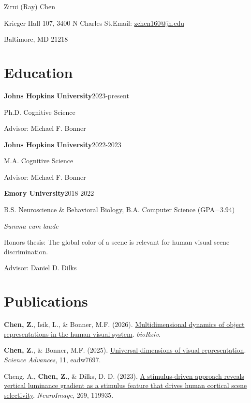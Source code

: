 \documentclass[10pt,letterpaper]{article}
\newcommand{\entry}[2]{\textbf{#1}\hfill #2\par}
\newcommand{\cit}[1]{\begingroup\hangindent=0.32in\hangafter=1 #1\par\endgroup\vspace{3pt}}
\begin{document}
\thispagestyle{empty}

{\fontsize{22}{26}\selectfont Zirui (Ray) Chen\par}
\vspace{6pt}
Krieger Hall 107, 3400 N Charles St.\hfill Email: \href{mailto:zchen160@jh.edu}{zchen160@jh.edu}\par
Baltimore, MD 21218\par

\section{Education}
\entry{Johns Hopkins University}{2023-present}
Ph.D. Cognitive Science\par
Advisor: Michael F. Bonner\par
\vspace{8pt}

\entry{Johns Hopkins University}{2022-2023}
M.A. Cognitive Science\par
Advisor: Michael F. Bonner\par
\vspace{8pt}

\entry{Emory University}{2018-2022}
B.S. Neuroscience \& Behavioral Biology, B.A. Computer Science (GPA=3.94)\par
\textit{Summa cum laude}\par
Honors thesis: The global color of a scene is relevant for human visual scene discrimination.\par
Advisor: Daniel D. Dilks\par

\section{Publications}
\cit{\textbf{Chen, Z.}, Isik, L., \& Bonner, M.F. (2026). \href{https://doi.org/10.64898/2026.04.27.720701}{Multidimensional dynamics of object representations in the human visual system}. \textit{bioRxiv}.}
\cit{\textbf{Chen, Z.}, \& Bonner, M.F. (2025). \href{https://doi.org/10.1126/sciadv.adw7697}{Universal dimensions of visual representation}. \textit{Science Advances}, 11, eadw7697.}
\cit{Cheng, A., \textbf{Chen, Z.}, \& Dilks, D. D. (2023). \href{https://doi.org/10.1016/j.neuroimage.2023.119935}{A stimulus-driven approach reveals vertical luminance gradient as a stimulus feature that drives human cortical scene selectivity}. \textit{NeuroImage}, 269, 119935.}
\end{document}
